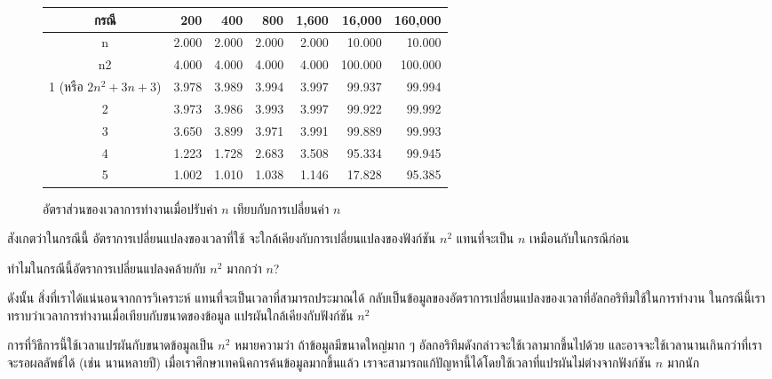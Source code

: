 \begin{figure}
{\small
\begin{center}
\begin{tabular}{|c|r|r|r|r|r|r|}
\hline
กรณี & 200 & 400 & 800 & 1,600 & 16,000 & 160,000\\
\hline
n & 2.000 & 2.000 & 2.000 & 2.000 & 10.000 & 10.000\\
n2 & 4.000 & 4.000 & 4.000 & 4.000 & 100.000 & 100.000\\
1 (หรือ $2n^2 + 3n + 3$) & 3.978 & 3.989 & 3.994 & 3.997 & 99.937 & 99.994\\
2 & 3.973 & 3.986 & 3.993 & 3.997 & 99.922 & 99.992\\
3 & 3.650 & 3.899 & 3.971 & 3.991 & 99.889 & 99.993\\
4 & 1.223 & 1.728 & 2.683 & 3.508 & 95.334 & 99.945\\
5 & 1.002 & 1.010 & 1.038 & 1.146 & 17.828 & 95.385\\
\hline
\end{tabular}
\end{center}
}
\caption{อัตราส่วน{\wbr}ของ{\wbr}เวลา{\wbr}การ{\wbr}ทำงาน{\wbr}เมื่อ{\wbr}ปรับ{\wbr}ค่า $n$ เทียบ{\wbr}กับ{\wbr}การ{\wbr}เปลี่ยน{\wbr}ค่า $n$}
\label{fig:analysis-runtimes-by-n-2-div}
\end{figure}

สังเกต{\wbr}ว่า{\wbr}ใน{\wbr}กรณี{\wbr}นี้ อัตรา{\wbr}การ{\wbr}เปลี่ยนแปลง{\wbr}ของ{\wbr}เวลา{\wbr}ที่{\wbr}ใช้{\wbr}
จะ{\wbr}ใกล้เคียง{\wbr}กับ{\wbr}การ{\wbr}เปลี่ยนแปลง{\wbr}ของ{\wbr}ฟังก์ชัน $n^2$ แทน{\wbr}ที่{\wbr}จะ{\wbr}เป็น $n$ เหมือน{\wbr}กับ{\wbr}ใน{\wbr}กรณี{\wbr}ก่อน{\wbr}

\begin{quiz}{}
ทำไม{\wbr}ใน{\wbr}กรณี{\wbr}นี้{\wbr}อัตรา{\wbr}การ{\wbr}เปลี่ยนแปลง{\wbr}คล้าย{\wbr}กับ $n^2$ มาก{\wbr}กว่า $n$?
\end{quiz}

ดังนั้น สิ่ง{\wbr}ที่{\wbr}เรา{\wbr}ได้{\wbr}แน่นอน{\wbr}จาก{\wbr}การ{\wbr}วิเคราะห์ แทน{\wbr}ที่{\wbr}จะ{\wbr}เป็น{\wbr}เวลา{\wbr}ที่{\wbr}สามารถ{\wbr}ประมาณ{\wbr}ได้{\wbr}
กลับ{\wbr}เป็น{\wbr}ข้อมูล{\wbr}ของ{\wbr}อัตรา{\wbr}การ{\wbr}เปลี่ยนแปลง{\wbr}ของ{\wbr}เวลา{\wbr}ที่{\wbr}อัล{\wbr}กอ{\wbr}ริ{\wbr}ทึม{\wbr}ใช้{\wbr}ใน{\wbr}การ{\wbr}ทำงาน{\wbr}
ใน{\wbr}กรณี{\wbr}นี้{\wbr}เรา{\wbr}ทราบ{\wbr}ว่า{\wbr}เวลา{\wbr}การ{\wbr}ทำงาน{\wbr}เมื่อ{\wbr}เทียบ{\wbr}กับ{\wbr}ขนาด{\wbr}ของ{\wbr}ข้อมูล แปรผัน{\wbr}ใกล้เคียง{\wbr}กับ{\wbr}ฟังก์ชัน{\wbr}
$n^2$

การ{\wbr}ที่{\wbr}วิธีการ{\wbr}นี้{\wbr}ใช้เวลา{\wbr}แปรผัน{\wbr}กับ{\wbr}ขนาด{\wbr}ข้อมูล{\wbr}เป็น $n^2$ หมายความ{\wbr}ว่า ถ้า{\wbr}ข้อมูล{\wbr}มี{\wbr}ขนาด{\wbr}ใหญ่{\wbr}มาก{\wbr}
ๆ อัล{\wbr}กอ{\wbr}ริ{\wbr}ทึม{\wbr}ดังกล่าว{\wbr}จะ{\wbr}ใช้เวลา{\wbr}มาก{\wbr}ขึ้น{\wbr}ไป{\wbr}ด้วย{\wbr}
และ{\wbr}อาจ{\wbr}จะ{\wbr}ใช้เวลา{\wbr}นาน{\wbr}เกิน{\wbr}กว่า{\wbr}ที่{\wbr}เรา{\wbr}จะ{\wbr}รอ{\wbr}ผลลัพธ์{\wbr}ได้ (เช่น นาน{\wbr}หลาย{\wbr}ปี)
เมื่อ{\wbr}เรา{\wbr}ศึกษา{\wbr}เทคนิค{\wbr}การ{\wbr}ค้น{\wbr}ข้อมูล{\wbr}มาก{\wbr}ขึ้น{\wbr}แล้ว{\wbr}
เรา{\wbr}จะ{\wbr}สามารถ{\wbr}แก้{\wbr}ปัญหา{\wbr}นี้{\wbr}ได้{\wbr}โดย{\wbr}ใช้เวลา{\wbr}ที่{\wbr}แปรผัน{\wbr}ไม่{\wbr}ต่าง{\wbr}จาก{\wbr}ฟังก์ชัน $n$ มาก{\wbr}นัก{\wbr}

